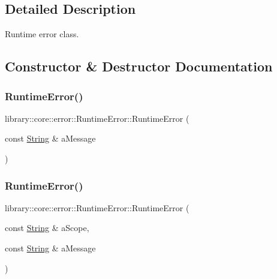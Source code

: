 \subsection{Detailed Description}
Runtime error class. 

\subsection{Constructor \& Destructor Documentation}
\mbox{\label{classlibrary_1_1core_1_1error_1_1_runtime_error_a6ba0ac577d200ad5f83843ecbe775c2f}} 
\subsubsection{\texorpdfstring{Runtime\+Error()}{RuntimeError()}\hspace{0.1cm}{\footnotesize\ttfamily [1/2]}}
{\footnotesize\ttfamily library\+::core\+::error\+::\+Runtime\+Error\+::\+Runtime\+Error (\begin{DoxyParamCaption}\item[{const \hyperlink{classlibrary_1_1core_1_1types_1_1_string}{String} \&}]{a\+Message }\end{DoxyParamCaption})}

\mbox{\label{classlibrary_1_1core_1_1error_1_1_runtime_error_ac0e3fcfbbd3636c42dc6e64461e41d85}} 
\subsubsection{\texorpdfstring{Runtime\+Error()}{RuntimeError()}\hspace{0.1cm}{\footnotesize\ttfamily [2/2]}}
{\footnotesize\ttfamily library\+::core\+::error\+::\+Runtime\+Error\+::\+Runtime\+Error (\begin{DoxyParamCaption}\item[{const \hyperlink{classlibrary_1_1core_1_1types_1_1_string}{String} \&}]{a\+Scope,  }\item[{const \hyperlink{classlibrary_1_1core_1_1types_1_1_string}{String} \&}]{a\+Message }\end{DoxyParamCaption})}

